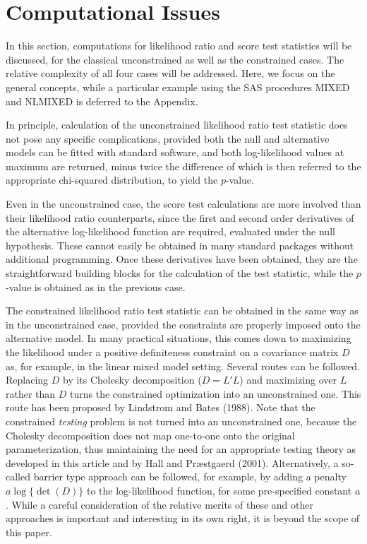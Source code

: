 \documentclass[useAMS,usenatbib,referee]{biom}
\begin{document}
\section{Computational Issues\label{computational}}

In this section, computations for likelihood ratio and score test
statistics will be discussed, for the classical unconstrained as well
as the constrained cases. The relative complexity of all four cases
will be addressed. Here, we focus on the general concepts, while a
particular example using the SAS procedures MIXED and NLMIXED is
deferred to the Appendix.

In principle, calculation of the unconstrained likelihood ratio test
statistic does not pose any specific complications, provided both the
null and alternative models can be fitted with standard software, and
both log-likelihood values at maximum are returned, minus twice the
difference of which is then referred to the appropriate chi-squared
distribution, to yield the $p$-value.

Even in the unconstrained case, the score test calculations are more
involved than their likelihood ratio counterparts, since the first and
second order derivatives of the alternative log-likelihood function
are required, evaluated under the null hypothesis. These cannot easily
be obtained in many standard packages without additional
programming. Once these derivatives have been obtained, they are the
straightforward building blocks for the calculation of the test
statistic, while the $p$-value is obtained as in the previous case.

The constrained likelihood ratio test statistic can be obtained in the
same way as in the unconstrained case, provided the constraints are
properly imposed onto the alternative model. In many practical
situations, this comes down to maximizing the likelihood under a
positive definiteness constraint on a covariance matrix $D$ as, for
example, in the linear mixed model setting. Several routes can be
followed. Replacing $D$ by its Cholesky decomposition ($D=L'L$) and
maximizing over $L$ rather than $D$ turns the constrained optimization
into an unconstrained one. This route has been proposed by Lindstrom
and Bates (1988). Note that the constrained {\em testing\/} problem is
not turned into an unconstrained one, because the Cholesky
decomposition does not map one-to-one onto the original
parameterization, thus maintaining the need for an appropriate testing
theory as developed in this article and by Hall and Pr{\ae}stgaerd
(2001). Alternatively, a so-called barrier type approach can be
followed, for example, by adding a penalty $a\log\{\det(D)\}$ to the
log-likelihood function, for some pre-specified constant $a$. While a
careful consideration of the relative merits of these and other
approaches is important and interesting in its own right, it is beyond
the scope of this paper.
\end{document}

